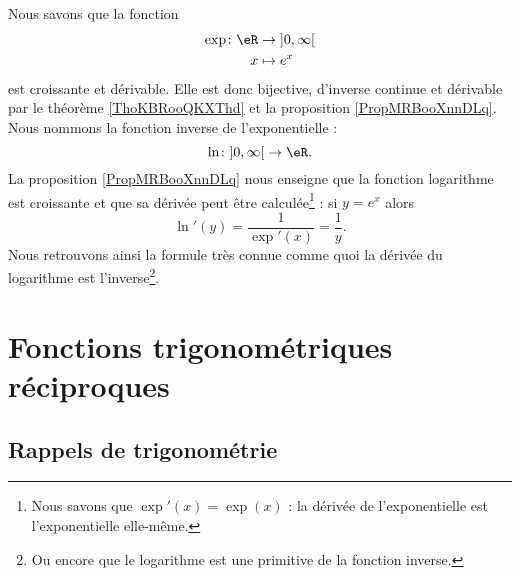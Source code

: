 \begin{example}    \label{ExZLMooMzYqfK}
    Nous savons que la fonction
    \begin{equation}
        \begin{aligned}
        \exp\colon \eR&\to \mathopen] 0 , \infty \mathclose[ \\
            x&\mapsto e^x 
        \end{aligned}
    \end{equation}
    est croissante et dérivable. Elle est donc bijective, d'inverse continue et dérivable par le théorème \ref{ThoKBRooQKXThd} et la proposition \ref{PropMRBooXnnDLq}. Nous nommons  la fonction inverse de l'exponentielle :
    \begin{equation}
    \ln\colon \mathopen] 0 , \infty \mathclose[\to \eR.
    \end{equation}
    La proposition \ref{PropMRBooXnnDLq} nous enseigne que la fonction logarithme est croissante et que sa dérivée peut être calculée\footnote{Nous savons que \( \exp'(x)=\exp(x)\) : la dérivée de l'exponentielle est l'exponentielle elle-même.} : si \( y= e^{x}\) alors
    \begin{equation}
        \ln'(y)=\frac{1}{ \exp'(x) }=\frac{1}{ y }.
    \end{equation}
    Nous retrouvons ainsi la formule très connue comme quoi la dérivée du logarithme est l'inverse\footnote{Ou encore que le logarithme est une primitive de la fonction inverse.}.
\end{example}

\section{Fonctions trigonométriques réciproques}

\subsection{Rappels de trigonométrie}
\label{secHTVooJuBtam}

